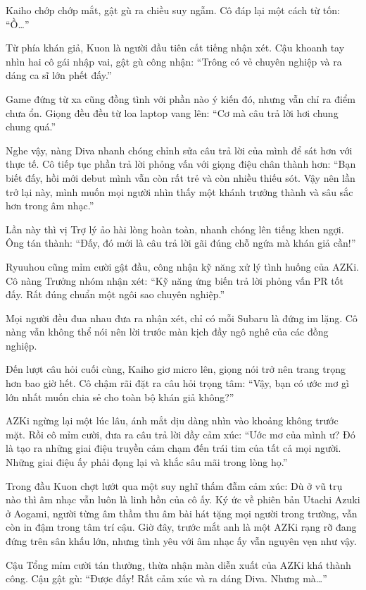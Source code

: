 \documentclass[../main.tex]{subfiles}
\begin{document}
Kaiho chớp chớp mắt, gật gù ra chiều suy ngẫm. Cô đáp lại một cách từ tốn: ``Ồ\dots''

Từ phía khán giả, Kuon là người đầu tiên cất tiếng nhận xét. Cậu khoanh tay nhìn hai cô gái nhập vai, gật gù công nhận: ``Trông có vẻ chuyên nghiệp và ra dáng ca sĩ lớn phết đấy.''

Game đứng từ xa cũng đồng tình với phần nào ý kiến đó, nhưng vẫn chỉ ra điểm chưa ổn. Giọng đều đều từ loa laptop vang lên: ``Cơ mà câu trả lời hơi chung chung quá.''

Nghe vậy, nàng Diva nhanh chóng chỉnh sửa câu trả lời của mình để sát hơn với thực tế. Cô tiếp tục phần trả lời phỏng vấn với giọng điệu chân thành hơn: ``Bạn biết đấy, hồi mới debut mình vẫn còn rất trẻ và còn nhiều thiếu sót. Vậy nên lần trở lại này, mình muốn mọi người nhìn thấy một khánh trưởng thành và sâu sắc hơn trong âm nhạc.''

Lần này thì vị Trợ lý ảo hài lòng hoàn toàn, nhanh chóng lên tiếng khen ngợi. Ông tán thành: ``Đấy, đó mới là câu trả lời gãi đúng chỗ ngứa mà khán giả cần!''

Ryuuhou cũng mỉm cười gật đầu, công nhận kỹ năng xử lý tình huống của AZKi. Cô nàng Trưởng nhóm nhận xét: ``Kỹ năng ứng biến trả lời phỏng vấn PR tốt đấy. Rất đúng chuẩn một ngôi sao chuyên nghiệp.''

Mọi người đều đua nhau đưa ra nhận xét, chỉ có mỗi Subaru là đứng im lặng. Cô nàng vẫn không thể nói nên lời trước màn kịch đầy ngô nghê của các đồng nghiệp.

Đến lượt câu hỏi cuối cùng, Kaiho giơ micro lên, giọng nói trở nên trang trọng hơn bao giờ hết. Cô chậm rãi đặt ra câu hỏi trọng tâm: ``Vậy, bạn có ước mơ gì lớn nhất muốn chia sẻ cho toàn bộ khán giả không?''

AZKi ngừng lại một lúc lâu, ánh mắt dịu dàng nhìn vào khoảng không trước mặt. Rồi cô mỉm cười, đưa ra câu trả lời đầy cảm xúc: ``Ước mơ của mình ư? Đó là tạo ra những giai điệu truyền cảm chạm đến trái tim của tất cả mọi người. Những giai điệu ấy phải đọng lại và khắc sâu mãi trong lòng họ.''

Trong đầu Kuon chợt lướt qua một suy nghĩ thấm đẫm cảm xúc: Dù ở vũ trụ nào thì âm nhạc vẫn luôn là linh hồn của cô ấy. Ký ức về phiên bản Utachi Azuki ở Aogami, người từng âm thầm thu âm bài hát tặng mọi người trong trường, vẫn còn in đậm trong tâm trí cậu. Giờ đây, trước mắt anh là một AZKi rạng rỡ đang đứng trên sân khấu lớn, nhưng tình yêu với âm nhạc ấy vẫn nguyên vẹn như vậy.

Cậu Tổng mỉm cười tán thưởng, thừa nhận màn diễn xuất của AZKi khá thành công. Cậu gật gù: ``Được đấy! Rất cảm xúc và ra dáng Diva. Nhưng mà\dots''
\end{document}
